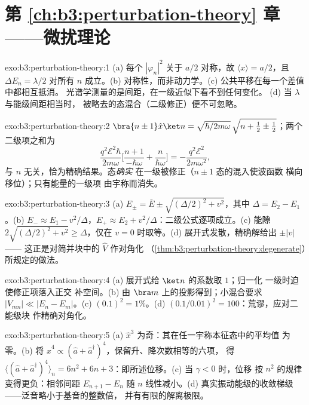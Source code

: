 \section*{第 \ref{ch:b3:perturbation-theory} 章——微扰理论}

\begin{solution}{exo:b3:perturbation-theory:1}
(a) 每个 $|\varphi_n|^2$ 关于 $a/2$ 对称，故 $\langle
x\rangle = a/2$，且 $\Delta E_n = \lambda/2$ 对所有 $n$ 成立。(b)
对称性，而非动力学。(c) 公共平移在每一个差值中都相互抵消。
光谱学测量的是间距，在一级近似下看不到任何变化。
(d) 当 $\lambda$ 与能级间距相当时，
被略去的态混合（二级修正）便不可忽略。
\end{solution}

\begin{solution}{exo:b3:perturbation-theory:2}
$\bra{n\pm1}\hat x\ket n = \sqrt{\hbar/2m\omega}\,\sqrt{n + \tfrac12
\pm \tfrac12}$；两个二级项之和为
\[
\frac{q^2\mathcal E^2\hbar}{2m\omega}\Big[\frac{n+1}{-\hbar\omega}
+ \frac{n}{\hbar\omega}\Big] = -\frac{q^2\mathcal E^2}{2m\omega^2} ,
\]
与 $n$ 无关，恰为精确结果。态\emph{确实}
在一级被修正（$n \pm 1$ 态的混入使波函数
横向移位）；只有能量的一级项
由宇称而消失。
\end{solution}

\begin{solution}{exo:b3:perturbation-theory:3}
(a) $E_\pm = \bar E \pm \sqrt{(\Delta/2)^2 + v^2}$，其中 $\Delta =
E_2 - E_1$。(b) $E_- \approx E_1 - v^2/\Delta$，$E_+ \approx E_2 +
v^2/\Delta$：二级公式逐项成立。(c) 能隙
$2\sqrt{(\Delta/2)^2 + v^2} \ge \Delta$，仅在 $v =
0$ 时取等。(d) 展开式发散，精确解给出 $\pm|v|$——
这正是对简并块中的 $\hat V$ 作对角化
（\cref{thm:b3:perturbation-theory:degenerate}）所规定的做法。
\end{solution}

\begin{solution}{exo:b3:perturbation-theory:4}
(a) 展开式给 $\ket n$ 的系数取 $1$；归一化
一级时迫使修正项落入正交
补空间。(b) 由 $\bra m$ 上的投影得到；小混合要求
$|V_{mn}| \ll |E_n - E_m|$。(c) $(0.1)^2 = 1\%$。(d)
$(0.1/0.01)^2 = 100$：荒谬，应对二能级块
作精确对角化。
\end{solution}

\begin{solution}{exo:b3:perturbation-theory:5}
(a) $\hat x^3$ 为奇：其在任一宇称本征态中的平均值
为零。(b) 将 $\hat x^4 \propto (\hat a + \hat
a^\dagger)^4$，保留升、降次数相等的六项，
得 $\langle(\hat a + \hat a^\dagger)^4\rangle_n = 6n^2
+ 6n + 3$：即所述位移。(c) 当 $\gamma < 0$ 时，位移
按 $n^2$ 的规律变得更负：相邻间距 $E_{n+1} - E_n$
随 $n$ 线性减小。(d) 真实振动能级的收敛梯级
——泛音略小于基音的整数倍，
并有有限的解离极限。
\end{solution}

